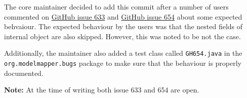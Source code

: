 \documentclass[12pt]{article}
\newcommand{\note}[1]{\textbf{Note:} #1}
\begin{document}
The core maintainer decided to add this commit after a number of
users commented on
\href{https://github.com/modelmapper/modelmapper/issues/633}{GitHub
issue 633} and
\href{https://github.com/modelmapper/modelmapper/issues/654}{GitHub
issue 654} about some expected behvaiour. The expected behaviour
by the users was that the nested fields of internal object are
also skipped. However, this was noted to be not the case.

Additionally, the maintainer also added a test class called
\texttt{GH654.java} in the \texttt{org.modelmapper.bugs} package
to make sure that the behaviour is properly documented.

\note{At the time of writing both issue 633 and 654 are open.}
\end{document}
